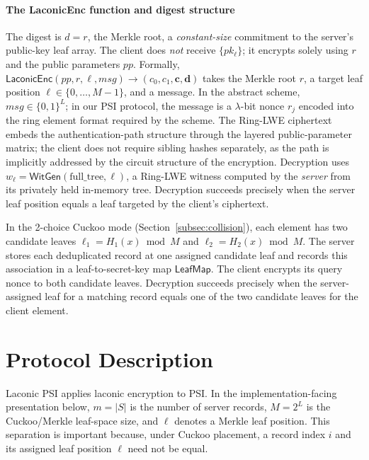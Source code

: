 \documentclass[preprint,12pt]{elsarticle}
\newcommand{\laconicenc}{\textsf{LaconicEnc}}
\newcommand{\witgen}{\textsf{WitGen}}
\newcommand{\LeafMap}{\mathsf{LeafMap}}
\begin{document}
\paragraph{The \laconicenc{} function and digest structure}
The digest is $d = r$, the Merkle root, a \emph{constant-size} commitment
to the server's public-key leaf array. The client does \emph{not} receive
$\{pk_\ell\}$; it encrypts solely using $r$ and the public parameters
$\mathit{pp}$. Formally,
$\laconicenc(\mathit{pp}, r, \ell, \mathit{msg}) \to
(c_0, c_1, \mathbf{c}, \mathbf{d})$ takes the Merkle root $r$, a target leaf
position $\ell \in \{0,\ldots,M-1\}$, and a message. In the abstract scheme,
$\mathit{msg} \in \{0,1\}^L$; in our PSI protocol, the message is a
$\lambda$-bit nonce $r_j$ encoded into the ring element format required by the
scheme. The Ring-LWE ciphertext embeds the authentication-path structure
through the layered public-parameter matrix; the client does not require
sibling hashes separately, as the path is implicitly addressed by the circuit
structure of the encryption. Decryption uses
$w_\ell = \witgen(\text{full\_tree}, \ell)$, a Ring-LWE witness computed by
the \emph{server} from its privately held in-memory tree. Decryption succeeds
precisely when the server leaf position equals a leaf targeted by the client's
ciphertext.

In the 2-choice Cuckoo mode (Section~\ref{subsec:collision}), each element
has two candidate leaves $\ell_1 = H_1(x) \bmod M$ and
$\ell_2 = H_2(x) \bmod M$. The server stores each deduplicated record at one
assigned candidate leaf and records this association in a leaf-to-secret-key
map $\LeafMap$. The client encrypts its query nonce to both candidate leaves.
Decryption succeeds precisely when the server-assigned leaf for a matching
record equals one of the two candidate leaves for the client element.


\section{Protocol Description}
\label{sec:protocol}

Laconic PSI applies laconic encryption to PSI. In the implementation-facing
presentation below, $m=|S|$ is the number of server records, $M=2^L$ is the
Cuckoo/Merkle leaf-space size, and $\ell$ denotes a Merkle leaf position. This
separation is important because, under Cuckoo placement, a record index $i$
and its assigned leaf position $\ell$ need not be equal.
\end{document}
